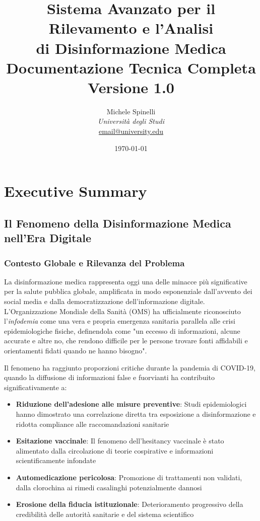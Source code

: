 \documentclass[12pt,a4paper]{report}
\title{
    \vspace{2cm}
    \textbf{\Huge Sistema Avanzato per il Rilevamento e l'Analisi\\di Disinformazione Medica}\\
    \vspace{1cm}
    \Large Documentazione Tecnica Completa\\
    \vspace{0.5cm}
    \large Versione 1.0
    \vspace{2cm}
}
\author{
    Michele Spinelli\\
    \vspace{0.5cm}
    \textit{Università degli Studi}\\
    \vspace{0.3cm}
    \small \href{mailto:email@university.edu}{email@university.edu}
}
\date{\today}
\begin{document}
\maketitle

\tableofcontents
\newpage
\listoffigures
\newpage
\listoftables
\newpage

\chapter{Executive Summary}

\section{Il Fenomeno della Disinformazione Medica nell'Era Digitale}

\subsection{Contesto Globale e Rilevanza del Problema}

La disinformazione medica rappresenta oggi una delle minacce più significative per la salute pubblica globale, amplificata in modo esponenziale dall'avvento dei social media e dalla democratizzazione dell'informazione digitale. L'Organizzazione Mondiale della Sanità (OMS) ha ufficialmente riconosciuto l'\textit{infodemia} come una vera e propria emergenza sanitaria parallela alle crisi epidemiologiche fisiche, definendola come "un eccesso di informazioni, alcune accurate e altre no, che rendono difficile per le persone trovare fonti affidabili e orientamenti fidati quando ne hanno bisogno".

Il fenomeno ha raggiunto proporzioni critiche durante la pandemia di COVID-19, quando la diffusione di informazioni false e fuorvianti ha contribuito significativamente a:

\begin{itemize}
    \item \textbf{Riduzione dell'adesione alle misure preventive}: Studi epidemiologici hanno dimostrato una correlazione diretta tra esposizione a disinformazione e ridotta compliance alle raccomandazioni sanitarie
    \item \textbf{Esitazione vaccinale}: Il fenomeno dell'hesitancy vaccinale è stato alimentato dalla circolazione di teorie cospirative e informazioni scientificamente infondate
    \item \textbf{Automedicazione pericolosa}: Promozione di trattamenti non validati, dalla clorochina ai rimedi casalinghi potenzialmente dannosi
    \item \textbf{Erosione della fiducia istituzionale}: Deterioramento progressivo della credibilità delle autorità sanitarie e del sistema scientifico
\end{itemize}
\end{document}
